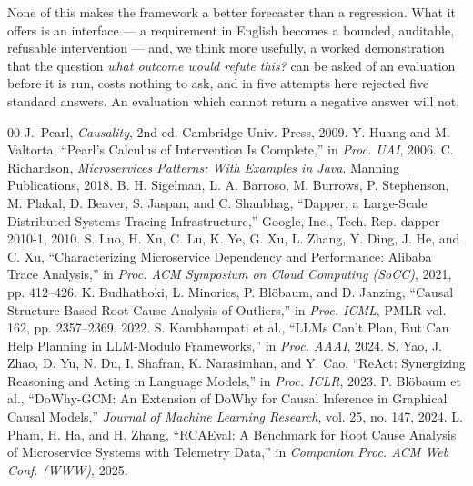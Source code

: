 \documentclass[journal, 10pt]{IEEEtran}
\begin{document}
None of this makes the framework a better forecaster than a regression. What it
offers is an interface --- a requirement in English becomes a bounded, auditable,
refusable intervention --- and, we think more usefully, a worked demonstration
that the question \emph{what outcome would refute this?} can be asked of an
evaluation before it is run, costs nothing to ask, and in five attempts here
rejected five standard answers. An evaluation which cannot return a negative
answer will not.


\begin{thebibliography}{00}
J.~Pearl, \emph{Causality}, 2nd ed. Cambridge Univ. Press, 2009.
Y. Huang and M. Valtorta, ``Pearl's Calculus of Intervention Is Complete,'' in \emph{Proc. UAI}, 2006.
C. Richardson, \emph{Microservices Patterns: With Examples in Java}. Manning Publications, 2018.
B. H. Sigelman, L. A. Barroso, M. Burrows, P. Stephenson, M. Plakal, D. Beaver, S. Jaspan, and C. Shanbhag, ``Dapper, a Large-Scale Distributed Systems Tracing Infrastructure,'' Google, Inc., Tech. Rep. dapper-2010-1, 2010.
S. Luo, H. Xu, C. Lu, K. Ye, G. Xu, L. Zhang, Y. Ding, J. He, and C. Xu, ``Characterizing Microservice Dependency and Performance: Alibaba Trace Analysis,'' in \emph{Proc. ACM Symposium on Cloud Computing (SoCC)}, 2021, pp. 412--426.
K. Budhathoki, L. Minorics, P. Blöbaum, and D. Janzing, ``Causal Structure-Based Root Cause Analysis of Outliers,'' in \emph{Proc. ICML}, PMLR vol. 162, pp. 2357--2369, 2022.
S. Kambhampati et al., ``LLMs Can't Plan, But Can Help Planning in LLM-Modulo Frameworks,'' in \emph{Proc. AAAI}, 2024.
S. Yao, J. Zhao, D. Yu, N. Du, I. Shafran, K. Narasimhan, and Y. Cao, ``ReAct: Synergizing Reasoning and Acting in Language Models,'' in \emph{Proc. ICLR}, 2023.
P. Blöbaum et al., ``DoWhy-GCM: An Extension of DoWhy for Causal Inference in Graphical Causal Models,'' \emph{Journal of Machine Learning Research}, vol. 25, no. 147, 2024.
L. Pham, H. Ha, and H. Zhang, ``RCAEval: A Benchmark for Root Cause Analysis of Microservice Systems with Telemetry Data,'' in \emph{Companion Proc. ACM Web Conf. (WWW)}, 2025.


\end{thebibliography}
\end{document}
